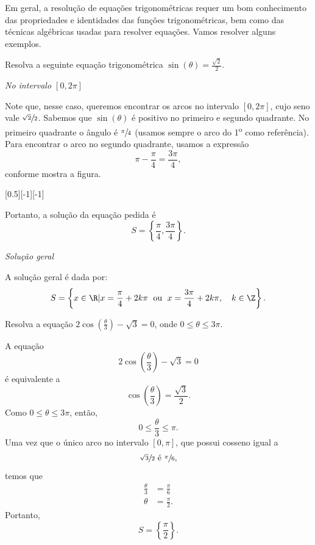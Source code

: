 Em geral, a resolução de equações trigonométricas requer um bom conhecimento
das propriedades e identidades das funções trigonométricas, bem como das
técnicas algébricas usadas para resolver equações. Vamos resolver alguns
exemplos.

\begin{example}
  Resolva a seguinte equação trigonométrica \(\sin(\theta) = \frac{\sqrt{2}}{2}\).

  \solution
  \emph{No intervalo $[0, 2\pi]$}

  Note que, nesse caso, queremos encontrar os arcos no intervalo
  $[0, 2\pi]$, cujo seno vale $\sfrac{\sqrt{2}}{2}$. Sabemos que
  $\sin(\theta)$ é positivo no primeiro e segundo quadrante. No primeiro
  quadrante o ângulo é $\sfrac{\pi}{4}$ (usamos sempre o arco do 1\textsuperscript{o}
  como referência). Para encontrar o arco no segundo quadrante, usamos a
  expressão
  \[
    \pi-\frac{\pi}{4} = \frac{3\pi}{4},
  \]
  conforme mostra a figura.

  [0.5][-1][-1]

  Portanto, a solução da equação pedida é
  \[
    S = \left\{ \frac{\pi}{4}, \frac{3\pi}{4} \right\}.
  \]

  \emph{Solução geral}

  A solução geral é dada por:
  \[
    S =
    \left\{
       x \in \R | x=\frac{\pi}{4}+2k\pi
      \; \text{ ou } \;
      x = \frac{3\pi}{4} +2k\pi, \quad k \in \Z
    \right\}.
  \]
\end{example}

\begin{example}
  Resolva a equação
  \(2\cos\left(\frac{\theta}{3}\right) - \sqrt{3} = 0\),
  onde $0 \leq \theta \leq 3\pi$.

  \solution
  A equação
  \[
    2\cos\left(\frac{\theta}{3}\right) - \sqrt{3} = 0
  \]
  é equivalente a
  \[
    \cos\left(\frac{\theta}{3}\right) = \frac{\sqrt{3}}{2}.
  \]
  Como $0 \leq \theta \leq 3\pi$, então,
  \[
    0 \leq \frac{\theta}{3} \leq \pi.
  \]
  Uma vez que o único arco no intervalo $[0, \pi]$,
  que possui cosseno igual a
  \[
    \sfrac{\sqrt{3}}{2}$ é $\sfrac{\pi}{6},
  \]
  temos que
  \begin{align*}
    \frac{\theta}{3} & = \frac{\pi}{6}  \\
    \theta           & = \frac{\pi}{2}.
  \end{align*}
  Portanto,
  \[
    S = \left\{\frac{\pi}{2} \right\}.
  \]
\end{example}

